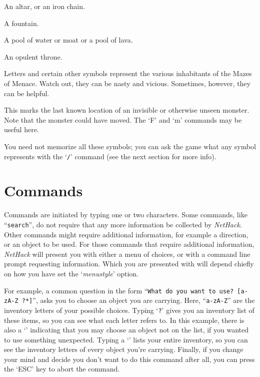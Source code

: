 \item[\tb{_}]
An altar, or an iron chain.
\item[\tb{\{}]
A fountain.
\item[\tb{\}}]
A pool of water or moat or a pool of lava.
\item[\tb{$\backslash$}]
An opulent throne.
\item[\tb{a-zA-Z {\rm \& other symbols}}]
Letters and certain other symbols represent the various inhabitants
of the Mazes of Menace.  Watch out, they can be nasty and vicious.
Sometimes, however, they can be helpful.
\item[\tb{I}]
This marks the last known location of an invisible or otherwise unseen
monster.  Note that the monster could have moved.  The `F' and `m' commands
may be useful here.

\elist
You need not memorize all these symbols; you can ask the game what any
symbol represents with the `{\tt /}' command (see the next section for
more info).

\section{Commands}

Commands are initiated by typing one or two characters.  Some commands,
like ``{\tt search}'', do not require that any more information be collected
by {\it NetHack\/}.  Other commands might require additional information, for
example a direction, or an object to be used.  For those commands that
require additional information, {\it NetHack\/} will present you with either 
a menu of choices, or with a command line prompt requesting information.  Which
you are presented with will depend chiefly on how you have set the
`{\it menustyle\/}'
option.

For example, a common question in the form ``{\tt What do you want to
use? [a-zA-Z\ ?*]}'', asks you to choose an object you are carrying.
Here, ``{\tt a-zA-Z}'' are the inventory letters of your possible choices.
Typing `{\tt ?}' gives you an inventory list of these items, so you can see
what each letter refers to.  In this example, there is also a `{\tt *}'
indicating that you may choose an object not on the list, if you
wanted to use something unexpected.  Typing a `{\tt *}' lists your entire
inventory, so you can see the inventory letters of every object you're
carrying.  Finally, if you change your mind and decide you don't want
to do this command after all, you can press the `ESC' key to abort the
command.

